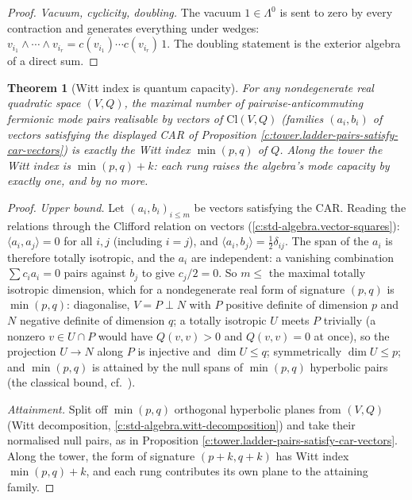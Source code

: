 \documentclass[11pt]{article}
\newtheorem{theorem}{Theorem}[section]
\theoremstyle{definition}
\theoremstyle{plain}
\providecommand{\Cl}{}\renewcommand{\Cl}{\mathrm{Cl}}
\begin{document}
\begin{proof}
\emph{Vacuum, cyclicity, doubling.} The vacuum $1 \in \Lambda^0$ is sent to zero by every contraction and generates everything under wedges: $v_{i_1} \wedge \cdots \wedge v_{i_r} = c(v_{i_1}) \cdots c(v_{i_r})\,1$. The doubling statement is the exterior algebra of a direct sum.

\end{proof}

\begin{theorem}[Witt index is quantum capacity]\label{c:tower.witt-index-quantum-capacity}
For any nondegenerate real quadratic space $(V, Q)$, the maximal number of pairwise-anticommuting fermionic mode pairs realisable by \emph{vectors} of $\Cl(V, Q)$ (families $(a_i, b_i)$ of vectors satisfying the displayed CAR of Proposition \ref{c:tower.ladder-pairs-satisfy-car-vectors}) is exactly the Witt index $\min(p,q)$ of $Q$. Along the tower the Witt index is $\min(p,q) + k$: each rung raises the algebra's mode capacity by exactly one, and by no more.
\end{theorem}
\begin{proof}
\emph{Upper bound.} Let $(a_i, b_i)_{i \leq m}$ be vectors satisfying the CAR. Reading the relations through the Clifford relation on vectors (\ref{c:std-algebra.vector-squares}): $\langle a_i, a_j \rangle = 0$ for all $i, j$ (including $i = j$), and $\langle a_i, b_j \rangle = \tfrac12 \delta_{ij}$. The span of the $a_i$ is therefore totally isotropic, and the $a_i$ are independent: a vanishing combination $\sum c_i a_i = 0$ pairs against $b_j$ to give $c_j/2 = 0$. So $m \leq$ the maximal totally isotropic dimension, which for a nondegenerate real form of signature $(p,q)$ is $\min(p,q)$: diagonalise, $V = P \perp N$ with $P$ positive definite of dimension $p$ and $N$ negative definite of dimension $q$; a totally isotropic $U$ meets $P$ trivially (a nonzero $v \in U \cap P$ would have $Q(v,v) > 0$ and $Q(v,v) = 0$ at once), so the projection $U \to N$ along $P$ is injective and $\dim U \leq q$; symmetrically $\dim U \leq p$; and $\min(p,q)$ is attained by the null spans of $\min(p,q)$ hyperbolic pairs (the classical bound, cf.\ \cite[Ch.~I]{Lam2005}).

\emph{Attainment.} Split off $\min(p,q)$ orthogonal hyperbolic planes from $(V, Q)$ (Witt decomposition, \ref{c:std-algebra.witt-decomposition}) and take their normalised null pairs, as in Proposition \ref{c:tower.ladder-pairs-satisfy-car-vectors}. Along the tower, the form of signature $(p{+}k, q{+}k)$ has Witt index $\min(p,q) + k$, and each rung contributes its own plane to the attaining family.

\end{proof}
\end{document}
